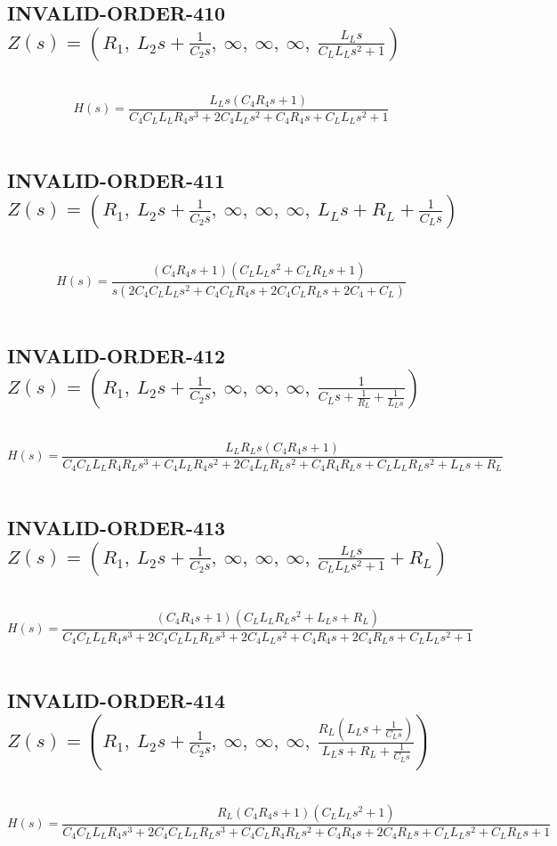 \documentclass{article}
\begin{document}
\subsection{INVALID-ORDER-410 $Z(s) = \left( R_{1}, \  L_{2} s + \frac{1}{C_{2} s}, \  \infty, \  \infty, \  \infty, \  \frac{L_{L} s}{C_{L} L_{L} s^{2} + 1}\right)$ } \ 
\textbf{\[H(s) = \frac{L_{L} s \left(C_{4} R_{4} s + 1\right)}{C_{4} C_{L} L_{L} R_{4} s^{3} + 2 C_{4} L_{L} s^{2} + C_{4} R_{4} s + C_{L} L_{L} s^{2} + 1}\] } \ 
\subsection{INVALID-ORDER-411 $Z(s) = \left( R_{1}, \  L_{2} s + \frac{1}{C_{2} s}, \  \infty, \  \infty, \  \infty, \  L_{L} s + R_{L} + \frac{1}{C_{L} s}\right)$ } \ 
\textbf{\[H(s) = \frac{\left(C_{4} R_{4} s + 1\right) \left(C_{L} L_{L} s^{2} + C_{L} R_{L} s + 1\right)}{s \left(2 C_{4} C_{L} L_{L} s^{2} + C_{4} C_{L} R_{4} s + 2 C_{4} C_{L} R_{L} s + 2 C_{4} + C_{L}\right)}\] } \ 
\subsection{INVALID-ORDER-412 $Z(s) = \left( R_{1}, \  L_{2} s + \frac{1}{C_{2} s}, \  \infty, \  \infty, \  \infty, \  \frac{1}{C_{L} s + \frac{1}{R_{L}} + \frac{1}{L_{L} s}}\right)$ } \ 
\textbf{\[H(s) = \frac{L_{L} R_{L} s \left(C_{4} R_{4} s + 1\right)}{C_{4} C_{L} L_{L} R_{4} R_{L} s^{3} + C_{4} L_{L} R_{4} s^{2} + 2 C_{4} L_{L} R_{L} s^{2} + C_{4} R_{4} R_{L} s + C_{L} L_{L} R_{L} s^{2} + L_{L} s + R_{L}}\] } \ 
\subsection{INVALID-ORDER-413 $Z(s) = \left( R_{1}, \  L_{2} s + \frac{1}{C_{2} s}, \  \infty, \  \infty, \  \infty, \  \frac{L_{L} s}{C_{L} L_{L} s^{2} + 1} + R_{L}\right)$ } \ 
\textbf{\[H(s) = \frac{\left(C_{4} R_{4} s + 1\right) \left(C_{L} L_{L} R_{L} s^{2} + L_{L} s + R_{L}\right)}{C_{4} C_{L} L_{L} R_{4} s^{3} + 2 C_{4} C_{L} L_{L} R_{L} s^{3} + 2 C_{4} L_{L} s^{2} + C_{4} R_{4} s + 2 C_{4} R_{L} s + C_{L} L_{L} s^{2} + 1}\] } \ 
\subsection{INVALID-ORDER-414 $Z(s) = \left( R_{1}, \  L_{2} s + \frac{1}{C_{2} s}, \  \infty, \  \infty, \  \infty, \  \frac{R_{L} \left(L_{L} s + \frac{1}{C_{L} s}\right)}{L_{L} s + R_{L} + \frac{1}{C_{L} s}}\right)$ } \ 
\textbf{\[H(s) = \frac{R_{L} \left(C_{4} R_{4} s + 1\right) \left(C_{L} L_{L} s^{2} + 1\right)}{C_{4} C_{L} L_{L} R_{4} s^{3} + 2 C_{4} C_{L} L_{L} R_{L} s^{3} + C_{4} C_{L} R_{4} R_{L} s^{2} + C_{4} R_{4} s + 2 C_{4} R_{L} s + C_{L} L_{L} s^{2} + C_{L} R_{L} s + 1}\] } \ 
\end{document}
